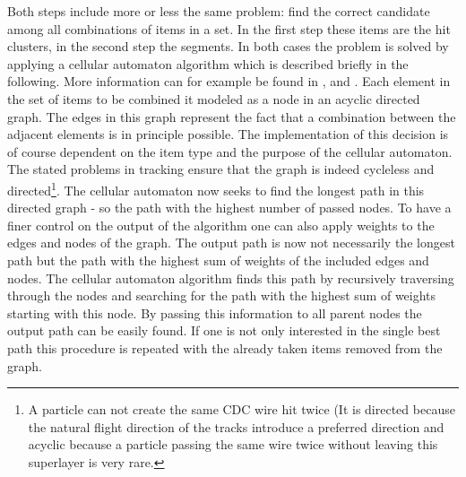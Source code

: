 Both steps include more or less the same problem: find the correct candidate among all combinations of items in a set. In the first step these items are the hit clusters, in the second step the segments. In both cases the problem is solved by applying a cellular automaton algorithm which is described briefly in the following. More information can for example be found in \cite{cats}, \cite{kisel} and \cite{oliver}. Each element in the set of items to be combined it modeled as a node in an acyclic directed graph. The edges in this graph represent the fact that a combination between the adjacent elements is in principle possible. The implementation of this decision is of course dependent on the item type and the purpose of the cellular automaton. The stated problems in tracking ensure that the graph is indeed cycleless and directed\footnote{A particle can not create the same CDC wire hit twice (It is directed because the natural flight direction of the tracks introduce a preferred direction and acyclic because a particle passing the same wire twice without leaving this superlayer is very rare.}. The cellular automaton now seeks to find the longest path in this directed graph - so the path with the highest number of passed nodes. To have a finer control on the output of the algorithm one can also apply weights to the edges and nodes of the graph. The output path is now not necessarily the longest path but the path with the highest sum of weights of the included edges and nodes. The cellular automaton algorithm finds this path by recursively traversing through the nodes and searching for the path with the highest sum of weights starting with this node. By passing this information to all parent nodes the output path can be easily found. If one is not only interested in the single best path this procedure is repeated with the already taken items removed from the graph.

